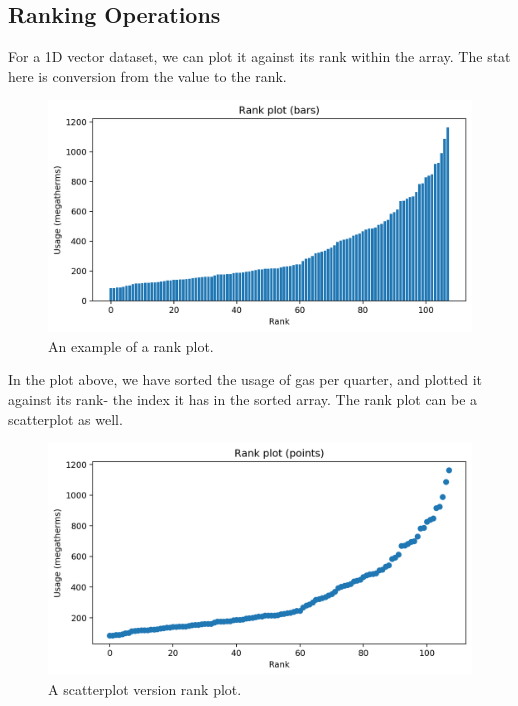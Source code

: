 \documentclass[a4paper, openany]{memoir}
\begin{document}
\subsection{Ranking Operations}
For a 1D vector dataset, we can plot it against its rank within the array. The stat here is conversion from the value to the rank.
\begin{figure}[H]
    \centering
    \includegraphics[scale=0.4]{src/2.30 Gas Example Plot 14.png}
    \caption{An example of a rank plot.}
\end{figure}
\noindent In the plot above, we have sorted the usage of gas per quarter, and plotted it against its rank- the index it has in the sorted array. The rank plot can be a scatterplot as well.
\begin{figure}[H]
    \centering
    \includegraphics[scale=0.4]{src/2.31 Gas Example Plot 15.png}
    \caption{A scatterplot version rank plot.}
\end{figure}
\end{document}
